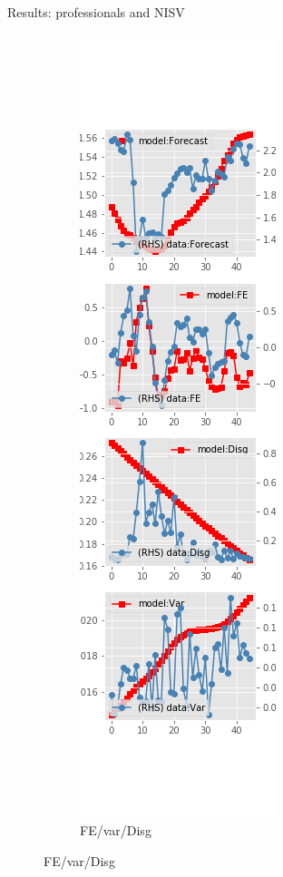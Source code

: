 \documentclass{beamer}
\begin{document}
\begin{frame}{Results: professionals and NISV}
\begin{figure}[ht]
\begin{subfigure}[b]{0.19\textwidth}
		\end{subfigure}
		\hfill
		\begin{subfigure}[b]{0.19\textwidth}
			\caption{FE/var/Disg}
			\includegraphics[width=\textwidth, height = 0.8\textheight]{figuresDraft/spf_ni_est_sv_diag4.png}
		\end{subfigure}
	\end{figure}
\end{frame}
\end{document}
